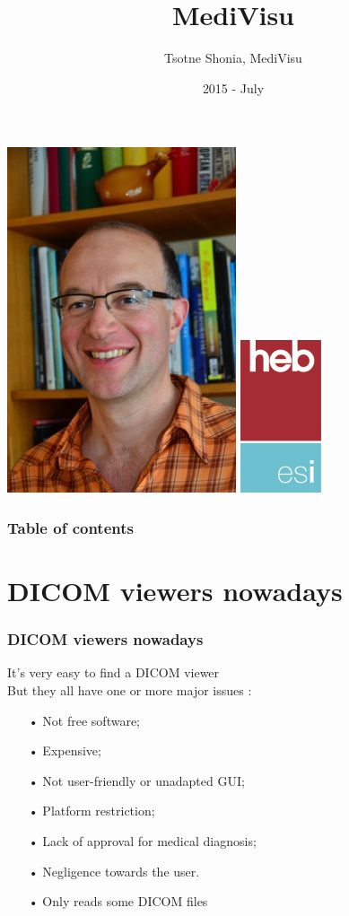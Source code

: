 \documentclass[11pt]{beamer}
\author{Tsotne Shonia, MediVisu}
\title{MediVisu}
\institute{HEB - ESI}
\date{2015 - July}
\begin{document}
\begin{frame}
\titlepage
\end{frame}

\begin{frame}
\hspace*{2cm} \includegraphics[scale=0.2]{npx.png} \hspace*{2.6cm} \includegraphics[scale=0.45]{esi.png}
\end{frame}

\begin{frame}
\frametitle{Table of contents}
\tableofcontents
\end{frame}

\section{DICOM viewers nowadays}

\begin{frame}
\frametitle{DICOM viewers nowadays}
It's very easy to find a DICOM viewer\\
But they all have one or more major issues :
\begin{itemize}
\item[•] Not free software;
\item[•] Expensive;
\item[•] Not user-friendly or unadapted GUI;
\item[•] Platform restriction;
\item[•] Lack of approval for medical diagnosis;
\item[•] Negligence towards the user.
\item[•] Only reads some DICOM files
\end{itemize}
\end{frame}
\end{document}

